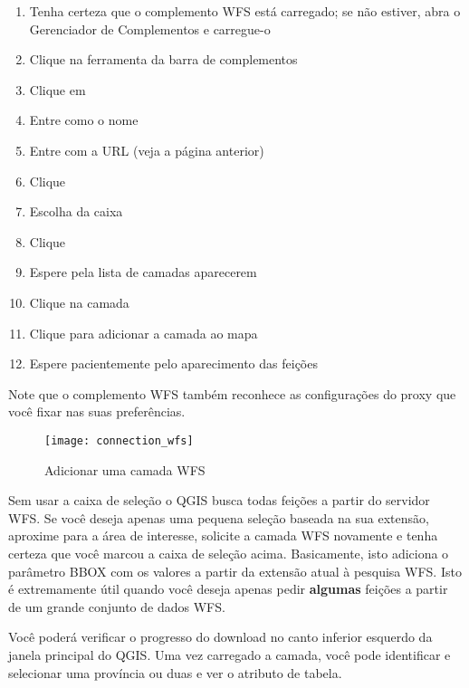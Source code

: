 \begin{enumerate}
  \item Tenha certeza que o complemento WFS está carregado; se não estiver, abra o Gerenciador de Complementos e carregue-o
  \item Clique na ferramenta  
  da barra de complementos
  \item Clique em  
  \item Entre  como o nome
  \item Entre com a URL (veja a página anterior)
  \item Clique  
  \item Escolha  da caixa
  \item Clique  
  \item Espere pela lista de camadas aparecerem
  \item Clique na camada 
  \item Clique  para adicionar a camada ao mapa
  \item Espere pacientemente pelo aparecimento das feições
\end{enumerate}

Note que o complemento WFS também reconhece as configurações do proxy que você fixar nas suas preferências.

\begin{figure}[ht]
  \centering
  	\texttt{[image: connection\_wfs]}
  	\caption{Adicionar uma camada WFS \nixcaption}\label{fig:wfs_dmsolutions}
\end{figure}

Sem usar a caixa de seleção  o QGIS busca todas feições a partir do servidor WFS. Se você deseja apenas  uma pequena seleção baseada na sua extensão, aproxime para a área de interesse, solicite a camada WFS novamente e tenha certeza que você marcou a caixa de seleção acima. Basicamente, isto adiciona o parâmetro BBOX com os valores a partir da extensão atual à pesquisa WFS. Isto é extremamente útil quando você deseja apenas pedir \textbf{algumas} feições a partir de um grande conjunto de dados WFS.

Você poderá verificar o progresso do download no canto inferior esquerdo da janela principal do QGIS. 
Uma vez carregado a camada, você pode identificar e selecionar uma província ou duas e ver o atributo de tabela.

